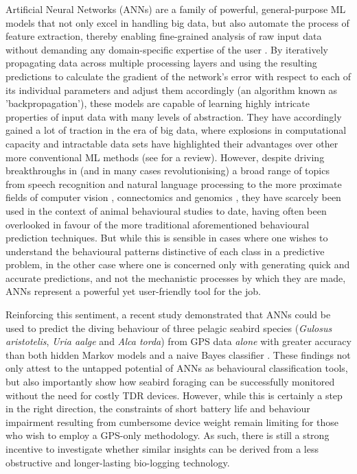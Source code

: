 \documentclass[11pt]{article}
\begin{document}
    Artificial Neural Networks (ANNs) are a family of powerful, general-purpose ML models that not only excel in handling big data, but also automate the process of feature extraction, thereby enabling fine-grained analysis of raw input data without demanding any domain-specific expertise of the user \citep{bishop1995neural}. By iteratively propagating data across multiple processing layers and using the resulting predictions to calculate the gradient of the network's error with respect to each of its individual parameters and adjust them accordingly (an algorithm known as 'backpropagation'), these models are capable of learning highly intricate properties of input data with many levels of abstraction. They have accordingly gained a lot of traction in the era of big data, where explosions in computational capacity and intractable data sets have highlighted their advantages over other more conventional ML methods (see \cite{lecun2015deep} for a review). However, despite driving breakthroughs in (and in many cases revolutionising) a broad range of topics from speech recognition and natural language processing \citep{collobert2011natural,sutskever2014sequence,mikolov2011strategies,wu2016google} to the more proximate fields of computer vision \citep{krizhevsky2012imagenet,girshick2014rich,farabet2012learning,tompson2014joint}, connectomics \citep{helmstaedter2013connectomic,turaga2010convolutional} and genomics \citep{eraslan2019deep,zou2019primer}, they have scarcely been used in the context of animal behavioural studies to date, having often been overlooked in favour of the more traditional aforementioned behavioural prediction techniques. But while this is sensible in cases where one wishes to understand the behavioural patterns distinctive of each class in a predictive problem, in the other case where one is concerned only with generating quick and accurate predictions, and not the mechanistic processes by which they are made, ANNs represent a powerful yet user-friendly tool for the job.
    
    Reinforcing this sentiment, a recent study demonstrated that ANNs could be used to predict the diving behaviour of three pelagic seabird species (\emph{Gulosus aristotelis}, \emph{Uria aalge} and \emph{Alca torda}) from GPS data \emph{alone} with greater accuracy than both hidden Markov models and a naive Bayes classifier \citep{browning2018predicting}. These findings not only attest to the untapped potential of ANNs as behavioural classification tools, but also importantly 
    show how seabird foraging can be successfully monitored without the need for costly TDR devices. However, while this is certainly a step in the right direction, the constraints of short battery life and behaviour impairment resulting from cumbersome device weight remain limiting for those who wish to employ a GPS-only methodology. As such, there is still a strong incentive to investigate whether similar insights can be derived from a less obstructive and longer-lasting bio-logging technology.
    
\end{document}
